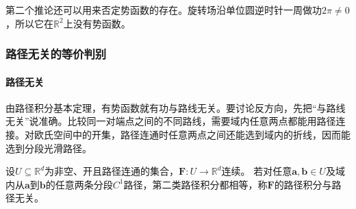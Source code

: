 第二个推论还可以用来否定势函数的存在。旋转场沿单位圆逆时针一周做功$2\pi\neq0$，所以它在$\mathbb R^2$上没有势函数。

\subsubsection{路径无关的等价判别}

\paragraph{路径无关}

由路径积分基本定理，有势函数就有功与路线无关。要讨论反方向，先把“与路线无关”说准确。比较同一对端点之间的不同路线，需要域内任意两点都能用路径连接。对欧氏空间中的开集，路径连通时任意两点之间还能选到域内的折线，因而能选到分段光滑路径。
\begin{definition}[路径无关]
设$U\subseteq\mathbb R^d$为非空、开且路径连通的集合，$\bm F:U\to\mathbb R^d$连续。
若对任意$\bm a,\bm b\in U$及域内从$\bm a$到$\bm b$的任意两条分段$C^1$路径，第二类路径积分都相等，称$\bm F$的路径积分与路径无关。
\end{definition}

